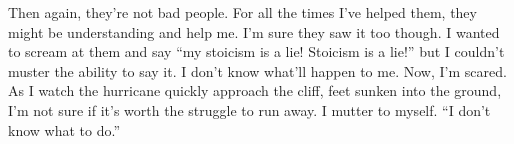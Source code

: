 \documentclass[a4paper, 12pt]{book}
\newcommand\tab[1][1cm]{\hspace*{#1}}
\begin{document}
\newline
\tab
Then again, they’re not bad people. For all the times I’ve helped them, they might be understanding and help me. I’m sure they saw it too though. I wanted to scream at them and say ``my stoicism is a lie! Stoicism is a lie!'' but I couldn’t muster the ability to say it. I don’t know what’ll happen to me. Now, I’m scared. As I watch the hurricane quickly approach the cliff, feet sunken into the ground, I’m not sure if it’s worth the struggle to run away. I mutter to myself. ``I don’t know what to do.''
\end{document}
